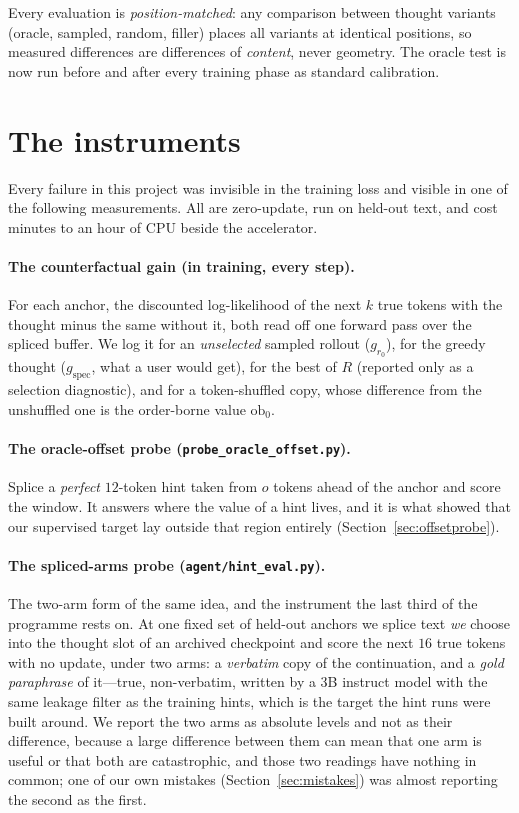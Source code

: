 \documentclass{article} %
\begin{document}
Every evaluation is \emph{position-matched}: any comparison between thought variants (oracle, sampled, random, filler) places all variants at identical positions, so measured differences are differences of \emph{content}, never geometry. The oracle test is now run before and after every training phase as standard calibration.

\section{The instruments}
\label{sec:instruments}

Every failure in this project was invisible in the training loss and visible in one of the following measurements. All are zero-update, run on held-out text, and cost minutes to an hour of CPU beside the accelerator.

\paragraph{The counterfactual gain (in training, every step).} For each anchor, the discounted log-likelihood of the next $k$ true tokens with the thought minus the same without it, both read off one forward pass over the spliced buffer. We log it for an \emph{unselected} sampled rollout ($g_{r_0}$), for the greedy thought ($g_{\mathrm{spec}}$, what a user would get), for the best of $R$ (reported only as a selection diagnostic), and for a token-shuffled copy, whose difference from the unshuffled one is the order-borne value $\mathrm{ob}_0$.

\paragraph{The oracle-offset probe (\texttt{probe\_oracle\_offset.py}).} Splice a \emph{perfect} $12$-token hint taken from $o$ tokens ahead of the anchor and score the window. It answers where the value of a hint lives, and it is what showed that our supervised target lay outside that region entirely (Section~\ref{sec:offsetprobe}).

\paragraph{The spliced-arms probe (\texttt{agent/hint\_eval.py}).} The two-arm form of the same idea, and the instrument the last third of the programme rests on. At one fixed set of held-out anchors we splice text \emph{we} choose into the thought slot of an archived checkpoint and score the next $16$ true tokens with no update, under two arms: a \emph{verbatim} copy of the continuation, and a \emph{gold paraphrase} of it---true, non-verbatim, written by a 3B instruct model with the same leakage filter as the training hints, which is the target the hint runs were built around. We report the two arms as absolute levels and not as their difference, because a large difference between them can mean that one arm is useful or that both are catastrophic, and those two readings have nothing in common; one of our own mistakes (Section~\ref{sec:mistakes}) was almost reporting the second as the first.
\end{document}

